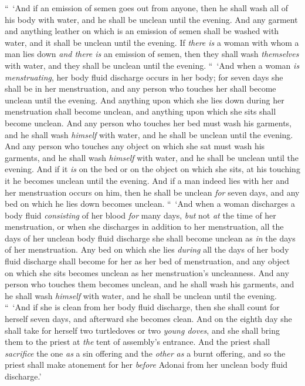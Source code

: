 \begin{biblechapter}
\verse “ ‘And if an emission of semen goes out from anyone, then he shall wash all of his body with water, and he shall be unclean until the evening.
\verse And any garment and anything leather on which is an emission of semen shall be washed with water, and it shall be unclean until the evening.
\verse If \textit{there is} a woman with whom a man lies down \textit{and there is} an emission of semen, then they shall wash \textit{themselves} with water, and they shall be unclean until the evening.
\verse “ ‘And when a woman \textit{is menstruating}, her body fluid discharge occurs in her body; for seven days she shall be in her menstruation, and any person who touches her shall become unclean until the evening.
\verse And anything upon which she lies down during her menstruation shall become unclean, and anything upon which she sits shall become unclean.
\verse And any person who touches her bed must wash his garments, and he shall wash \textit{himself} with water, and he shall be unclean until the evening.
\verse And any person who touches any object on which she sat must wash his garments, and he shall wash \textit{himself} with water, and he shall be unclean until the evening.
\verse And if it \textit{is} on the bed or on the object on which she sits, at his touching it he becomes unclean until the evening.
\verse And if a man indeed lies with her and her menstruation occurs on him, then he shall be unclean \textit{for} seven days, and any bed on which he lies down becomes unclean.
\verse “ ‘And when a woman discharges a body fluid \textit{consisting} of her blood \textit{for} many days, \textit{but} not \textit{at} the time of her menstruation, or when she discharges in addition to her menstruation, all the days of her unclean body fluid discharge she shall become unclean as \textit{in} the days of her menstruation.
\verse Any bed on which she lies \textit{during} all the days of her body fluid discharge shall become for her as her bed of menstruation, and any object on which she sits becomes unclean as her menstruation’s uncleanness.
\verse And any person who touches them becomes unclean, and he shall wash his garments, and he shall wash \textit{himself} with water, and he shall be unclean until the evening.
\verse “ ‘And if she is clean from her body fluid discharge, then she shall count for herself seven days, and afterward she becomes clean.
\verse And on the eighth day she shall take for herself two turtledoves or two \textit{young doves}, and she shall bring them to the priest at \textit{the} tent of assembly’s entrance.
\verse And the priest shall \textit{sacrifice} the one \textit{as} a sin offering and the \textit{other} \textit{as} a burnt offering, and so the priest shall make atonement for her \textit{before} Adonai from her unclean body fluid discharge.’

\end{biblechapter}
